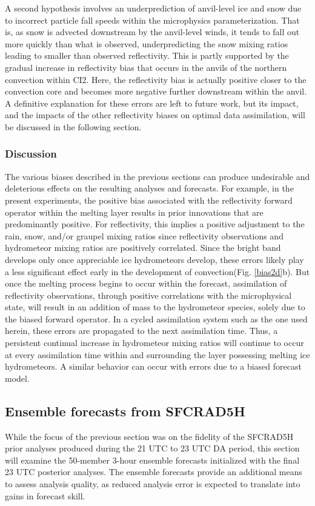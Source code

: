 A second hypothesis involves an underprediction of anvil-level ice and snow due to incorrect particle fall speeds within the microphysics parameterization. That is, as snow is advected downstream by the anvil-level winds, it tends to fall out more quickly than what is observed, underpredicting the snow mixing ratios leading to smaller than observed reflectivity. This is partly supported by the gradual increase in reflectivity bias that occurs in the anvils of the northern convection within CI2. Here, the reflectivity bias is actually positive closer to the convection core and becomes more negative further downstream within the anvil. A definitive explanation for these errors are left to future work, but its impact, and the impacts of the other reflectivity biases on optimal data assimilation, will be discussed in the following section.

\subsubsection{Discussion}
The various biases described in the previous sections can produce undesirable and deleterious effects on the resulting analyses and forecasts. For example, in the present experiments, the positive bias associated with the reflectivity forward operator within the melting layer results in prior innovations that are predominantly positive. For reflectivity, this implies a positive adjustment to the rain, snow, and/or graupel mixing ratios since reflectivity observations and hydrometeor mixing ratios are positively correlated. Since the bright band develops only once appreciable ice hydrometeors develop, these errors likely play a less significant effect early in the development of convection(Fig. \ref{bias2d}b). But once the melting process begins to occur within the forecast, assimilation of reflectivity observations, through positive correlations with the microphysical state, will result in an addition of mass to the hydrometeor species, solely due to the biased forward operator. In a cycled assimilation system such as the one used herein, these errors are propagated to the next assimilation time. Thus, a persistent continual increase in hydrometeor mixing ratios will continue to occur at every assimilation time within and surrounding the layer possessing melting ice hydrometeors. A similar behavior can occur with errors due to a biased forecast model.

\subsection{Ensemble forecasts from SFCRAD5H}
While the focus of the previous section was on the fidelity of the SFCRAD5H prior analyses produced during the 21 UTC to 23 UTC DA period, this section will examine the 50-member 3-hour ensemble forecasts initialized with the final 23 UTC posterior analyses. The ensemble forecasts provide an additional means to assess analysis quality, as reduced analysis error is expected to translate into gains in forecast skill.

